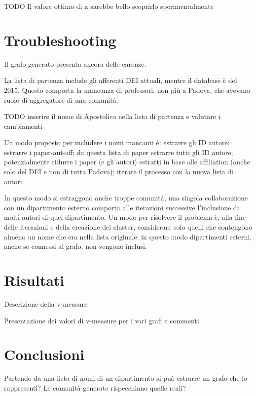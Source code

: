 \documentclass[12pt,a4paper,twoside]{report}
\begin{document}
TODO Il valore ottimo di x sarebbe bello scoprirlo sperimentalmente




\whitePage
\chapter{Troubleshooting} \label{cap:trouble}
Il grafo generato presenta ancora delle carenze.

La lista di partenza include gli afferenti DEI attuali, mentre il database è del 2015. Questo comporta la mancanza di professori, non più a Padova, che avevano ruolo di aggregatore di una comunità.

TODO inserire il nome di Apostolico nella lista di partenza e valutare i cambiamenti

Un modo proposto per includere i nomi mancanti è: estrarre gli ID autore; estrarre i paper-aut-aff; da questa lista di paper estrarre tutti gli ID autore; potenzialmente ridurre i paper (e gli autori) estratti in base alle affiliation (anche solo del DEI e non di tutta Padova); iterare il processo con la nuova lista di autori.

In questo modo si estraggono anche troppe comunità, una singola collaborazione con un dipartimento esterno comporta alle iterazioni successive l'inclusione di molti autori di quel dipartimento. Un modo per risolvere il problema è, alla fine delle iterazioni e della creazione dei cluster, considerare solo quelli che contengono almeno un nome che era nella lista originale: in questo modo dipartimenti esterni, anche se connessi al grafo, non vengono inclusi.



\whitePage
\chapter{Risultati} \label{cap:risultati}
Descrizione della v-measure

Presentazione dei valori di v-measure per i vari grafi e commenti.



\whitePage
\chapter{Conclusioni} \label{cap:conclusioni}
Partendo da una lista di nomi di un dipartimento si può estrarre un grafo che lo rappresenti? Le comunità generate rispecchiano quelle reali?




\nocite{*} %

\end{document}
